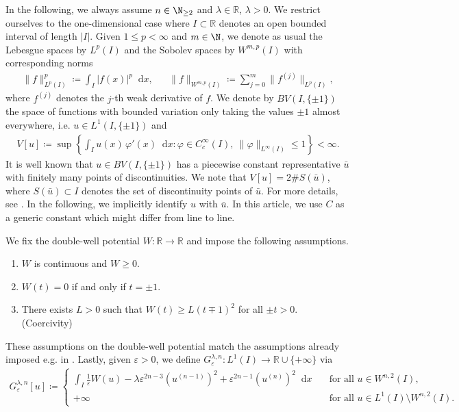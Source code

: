 \documentclass{article}
\newcommand{\dd}{\mathop{}\mathrm{d}} %
\newcommand{\lam}{\lambda}
\newcommand{\eps}{\varepsilon}
\numberwithin{figure}{section}
\newcommand{\R}{\mathbb{R}}
\numberwithin{equation}{section}
\begin{document}
 In the following, we always assume $n \in \N_{\geq2}$ and $\lam \in \R$, $\lam>0$. We restrict ourselves to the one-dimensional case where $I \subset \R$ denotes an open bounded interval of length $|I|$. Given $1 \leq p < \infty$ and $m \in \N$, we denote as usual the Lebesgue spaces by $L^p(I)$ and the Sobolev spaces by $W^{m,p}(I)$ with corresponding norms
    \begin{align}
        \|f\|^p_{L^p(I)} \coloneqq \int_I |f(x)|^p \dd x, && \|f\|_{W^{m,p}(I)} \coloneqq \sum_{j = 0}^m \|f^{(j)}\|_{L^p(I)},
    \end{align}
 where $f^{(j)}$ denotes the $j$-th weak derivative of $f$. We denote by $BV(I,\{\pm1\})$ the space of functions with bounded variation only taking the values $\pm 1$ almost everywhere, i.e. $u \in L^1(I,\{\pm 1\})$ and
    \begin{align}
        V[u] \coloneqq \sup \left\{ \int_I u(x) \, \varphi'(x) \dd x : \varphi \in C_c^\infty(I), \ \|\varphi\|_{L^\infty(I)} \leq 1 \right\} < \infty.
    \end{align}
It is well known that $u \in BV(I,\{\pm 1\})$ has a piecewise constant representative $\bar u$ with finitely many points of discontinuities. We note that $V[u] = 2 \# S(\bar u)$, where $S(\bar u) \subset I$ denotes the set of discontinuity points of $\bar u$. For more details, see \cite{EvaGar}. In the following, we implicitly identify $u$ with $\bar u$. In this article, we use $C$ as a generic constant which might differ from line to line.

We fix the double-well potential $W \colon \R \to \R$ and impose the following assumptions.
    \begin{enumerate}
        \item[(W1)] \label{it-W1} $W$ is continuous and $W \geq 0$.
        \item[(W2)] \label{it-W2} $W(t) = 0$ if and only if $t = \pm 1$.
        \item[(W3)] \label{it-W3} There exists $L > 0$ such that $ W(t) \geq L(t \mp 1)^2$ for all $\pm t > 0$. \hfill (Coercivity)
    \end{enumerate} \newcommand{\hyp}[1]{{\rm{(\hyperref[it-W#1]{W#1})}}}
These assumptions on the double-well potential match the assumptions already imposed e.g. in \cite{CicSpaZep, CheDalFonLeo}. Lastly, given $\eps > 0$, we define $G_\eps^{\lam, n} \colon L^1(I) \to \R \cup \{+\infty\}$ via
    \begin{align}
        G_\eps^{\lam, n}[u] \coloneqq \left\{ \begin{array}{ll}
             \displaystyle \int_I \frac 1\eps W(u) -\lam \eps^{2n-3} (u^{(n-1)})^2 + \eps^{2n-1} (u^{(n)})^2 \dd x    & \quad \text{for all } u \in W^{n,2}(I), \\[10pt]
             +\infty                                                                                                  & \quad \text{for all } u \in L^1(I) \setminus W^{n,2}(I). 
        \end{array} \right.
    \end{align}
\end{document}
